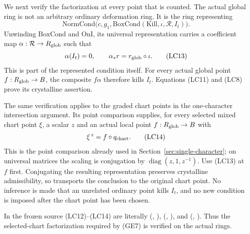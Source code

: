 We next verify the factorization at every point that is counted.
The actual global ring is not an arbitrary ordinary deformation ring.
It is the ring representing
\[
 \mathrm{NormCond}\bigl(c,g_1,
       \mathrm{BoxCond}(\mathrm{Kill},\iota,
                            \mathcal R,I_t)\bigr).
 \tag{LC12}
\]
Unwinding \(\mathrm{BoxCond}\) and \(\mathrm{OnI}\),
its universal representation carries a coefficient map
\(\alpha:\mathcal R\to R_{\rm glob}\) such that
\[
 \alpha(I_t)=0,\qquad
           \alpha_*r=r_{\rm glob}\circ\iota.
 \tag{LC13}
\]
This is part of the represented condition itself.
For every actual global point \(f:R_{\rm glob}\to B\),
the composite \(f\alpha\) therefore kills \(I_t\).
Equations (LC11) and (LC8) prove its crystalline assertion.

The same verification applies to the graded chart points
in the one-character intersection argument.
Its point comparison supplies, for every selected mixed
chart point \(\xi\), a scalar \(z\) and an actual local
point \(f:R_{\rm glob}\to B\) with
\[
                       \xi^{\,z}=f\circ q_{\rm chart}.
 \tag{LC14}
\]
This is the point comparison already used in
Section~\ref{sec:single-character};
on universal matrices the scaling is conjugation by
\(\operatorname{diag}(z,1,z^{-1})\).
Use (LC13) at \(f\) first.
Conjugating the resulting representation preserves
crystalline admissibility, so transports the conclusion
to the original chart point.
No inference is made that an unrelated ordinary point
kills \(I_t\), and no new condition is imposed after
the chart point has been chosen.

In the frozen source (LC12)--(LC14) are literally
(, ),
 (, ),
and  (, ).
Thus the selected-chart factorization required by (GE7)
is verified on the actual rings.

